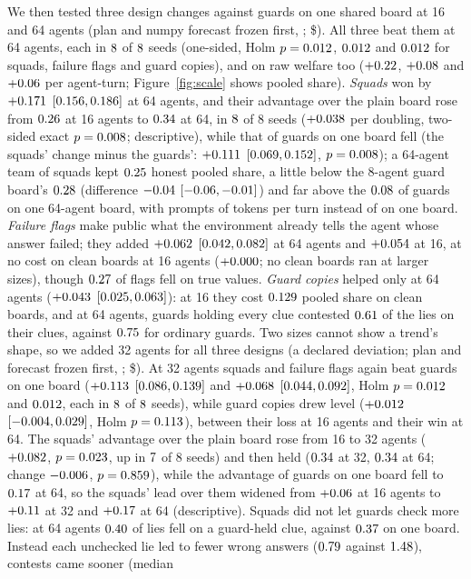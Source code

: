 \documentclass{article}
\begin{document}
We then tested three design changes against guards on one shared board at 16 and 64 agents (plan and numpy forecast frozen first, \texttt{\FourPlanHash}; \$\FourCost). All three beat them at 64 agents, each in $8$ of $8$ seeds (one-sided, Holm $p = 0.012$, $0.012$ and $0.012$ for squads, failure flags and guard copies), and on raw welfare too ($+0.22$, $+0.08$ and $+0.06$ per agent-turn; Figure~\ref{fig:scale} shows pooled share). \emph{Squads} won by $+0.171$ $[0.156, 0.186]$ at 64 agents, and their advantage over the plain board rose from $0.26$ at 16 agents to $0.34$ at 64, in $8$ of 8 seeds ($+0.038$ per doubling, two-sided exact $p = 0.008$; descriptive), while that of guards on one board fell (the squads' change minus the guards': $+0.111$ $[0.069, 0.152]$, $p = 0.008$); a 64-agent team of squads kept $0.25$ honest pooled share, a little below the 8-agent guard board's $0.28$ (difference $-0.04$ $[-0.06, -0.01]$) and far above the $0.08$ of guards on one 64-agent board, with prompts of \FourSquadsTokens{} tokens per turn instead of \FourBoardTokens{} on one board. \emph{Failure flags} make public what the environment already tells the agent whose answer failed; they added $+0.062$ $[0.042, 0.082]$ at 64 agents and $+0.054$ at 16, at no cost on clean boards at 16 agents ($+0.000$; no clean boards ran at larger sizes), though $0.27$ of flags fell on true values. \emph{Guard copies} helped only at 64 agents ($+0.043$ $[0.025, 0.063]$): at 16 they cost $0.129$ pooled share on clean boards, and at 64 agents, guards holding every clue contested $0.61$ of the lies on their clues, against $0.75$ for ordinary guards. Two sizes cannot show a trend's shape, so we added 32 agents for all three designs (a declared deviation; plan and forecast frozen first, \texttt{\FourBPlanHash}; \$\FourBCost). At 32 agents squads and failure flags again beat guards on one board ($+0.113$ $[0.086, 0.139]$ and $+0.068$ $[0.044, 0.092]$, Holm $p = 0.012$ and $0.012$, each in $8$ of $8$ seeds), while guard copies drew level ($+0.012$ $[-0.004, 0.029]$, Holm $p = 0.113$), between their loss at 16 agents and their win at 64. The squads' advantage over the plain board rose from 16 to 32 agents ($+0.082$, $p = 0.023$, up in $7$ of 8 seeds) and then held ($0.34$ at 32, $0.34$ at 64; change $-0.006$, $p = 0.859$), while the advantage of guards on one board fell to $0.17$ at 64, so the squads' lead over them widened from $+0.06$ at 16 agents to $+0.11$ at 32 and $+0.17$ at 64 (descriptive). Squads did not let guards check more lies: at 64 agents $0.40$ of lies fell on a guard-held clue, against $0.37$ on one board. Instead each unchecked lie led to fewer wrong answers ($0.79$ against $1.48$), contests came sooner (median 
\end{document}
